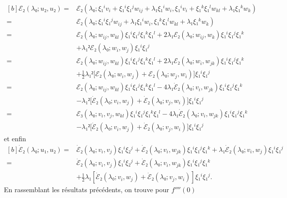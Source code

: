 \documentclass[12pt, final]{scrartcl}
\theoremstyle{definition}
\begin{document}
\begin{equation*}
  \begin{aligned}[b]
    ℰ₂(λ₀; u₂, u₂)
    ={} & ℰ₂(λ₀ ; ξ₁^i v_i + ξ₁^i ξ₁^j w_{i j} + λ₁ ξ₁^i w_i, ξ₁^i v_i + ξ₁^k ξ₁^l w_{k l} + λ₁ ξ₁^k w_k)\\
    ={} & ℰ₂(λ₀; ξ₁^i ξ₁^j w_{i j} + λ₁ ξ₁^i w_i, ξ₁^k ξ₁^l w_{k l} + λ₁ ξ₁^k w_k)\\
    ={} & ℰ₂(λ₀; w_{i j}, w_{k l}) ξ₁^i ξ₁^j ξ₁^k ξ₁^l + 2 λ₁ ℰ₂(λ₀ ; w_{i j}, w_k) ξ₁^i ξ₁^j ξ₁^k\\
    & + λ₁² ℰ₂(λ₀; w_i, w_j) ξ₁^i ξ₁^j\\
    ={} & ℰ₂(λ₀; w_{i j}, w_{k l}) ξ₁^i ξ₁^j ξ₁^k ξ₁^l + 2 λ₁ ℰ₂(λ₀ ; w_i, w_{j k}) ξ₁^i ξ₁^j ξ₁^k\\
    & + \tfrac{1}{2} λ₁² \bigl[ℰ₂(λ₀; w_i, w_j) + ℰ₂(λ₀; w_j, w_i)\bigr] ξ₁^i ξ₁^j\\
    ={} & ℰ₂(λ₀; w_{i j}, w_{k l}) ξ₁^i ξ₁^j ξ₁^k ξ₁^l - 4 λ₁ \dot{ℰ}₂ (λ₀; v_i, w_{j k}) ξ₁^i ξ₁^j ξ₁^k\\
    & - λ₁² \bigl[\dot{ℰ}₂(λ₀; v_i, w_j) + \dot{ℰ}₂(λ₀; v_j, w_i)\bigr] ξ₁^i ξ₁^j\\
    ={} & ℰ₃(λ₀; v_i, v_j, w_{k l}) ξ₁^i ξ₁^j ξ₁^k ξ₁^l - 4 λ₁ \dot{ℰ}₂(λ₀; v_i, w_{j k}) ξ₁^i ξ₁^j ξ₁^k\\
    & - λ₁² \bigl[\dot{ℰ}₂(λ₀; v_i, w_j) + \dot{ℰ}₂(λ₀; v_j, w_i)\bigr] ξ₁^i ξ₁^j
  \end{aligned}
\end{equation*}
et enfin
\begin{equation*}
  \begin{aligned}[b]
    \dot{ℰ}₂(λ₀; u₁, u₂)
    ={} & \dot{ℰ}₂ (λ₀; v_i, v_j) ξ₁^i ξ₂^j + \dot{ℰ}₂(λ₀ ; v_i, w_{j k}) ξ₁^i ξ₁^j ξ₁^k + λ₁ \dot{ℰ}₂(λ₀; v_i, w_j) ξ₁^i ξ₁^j\\
    ={} & \dot{ℰ}₂(λ₀; v_i, v_j) ξ₁^i ξ₂^j + \dot{ℰ}₂(λ₀; v_i, w_{j k}) ξ₁^i ξ₁^j ξ₁^k\\
    & + \tfrac{1}{2} λ₁ [\dot{ℰ}₂(λ₀ ; v_i, w_j) + \dot{ℰ}₂(λ₀; v_j, w_i)] ξ₁^i ξ₁^j.
  \end{aligned}
\end{equation*}
En rassemblant les résultats précédents, on trouve pour \(f''''(0)\)
\end{document}
